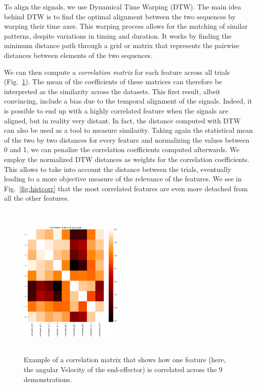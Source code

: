 \documentclass[conference]{IEEEtran}
\begin{document}
To align the signals, we use Dynamical Time Warping (DTW). The main idea behind DTW is to find the optimal alignment between the two sequences by warping their time axes. This warping process allows for the matching of similar patterns, despite variations in timing and duration. It works by finding the minimum distance path through a grid or matrix that represents the pairwise distances between elements of the two sequences. \newline


We can then compute a \textit{correlation matrix} for each feature across all trials (Fig.~\ref{fig:corrMat}). The mean of the coefficients of these matrices can therefore be interpreted as the similarity across the datasets. This first result, albeit convincing, include a bias due to the temporal alignment of the signals. Indeed, it is possible to end up with a highly correlated feature when the signals are aligned, but in reality very distant. In fact, the distance computed with DTW can also be used as a tool to measure similarity. Taking again the statistical mean of the two by two distances for every feature and normalizing the values between 0 and 1, we can penalize the correlation coefficients computed afterwards. We employ the normalized DTW distances as weights for the correlation coefficients. This allows to take into account the distance between the trials, eventually leading to a more objective measure of the relevance of the features. We see in Fig.~\ref{fig:histcorr} that the most correlated features are even more detached from all the other features.  

\begin{figure}[t]
  \centering
  \includegraphics[width=0.45\textwidth, height = 3in]{img/resolCorrMap.png}
  \caption{Example of a correlation matrix that shows how one feature (here, the angular Velocity of the end-effector) is correlated across the 9 demonstrations.}
  \label{fig:corrMat}
\end{figure}
\end{document}
